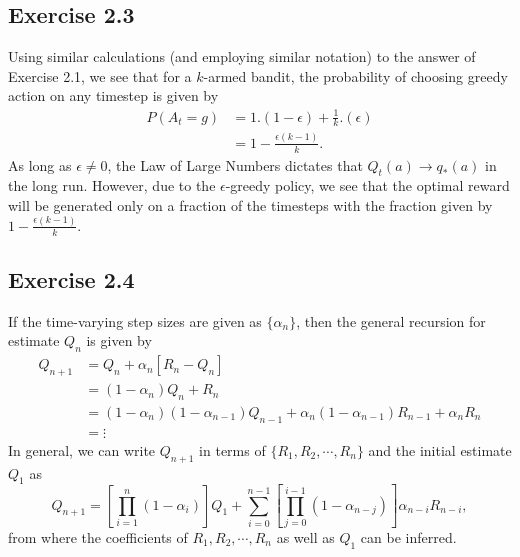 \documentclass[10pt]{article}
\begin{document}
	\subsection*{Exercise 2.3}
	\label{ss:2.3}
	Using similar calculations (and employing similar notation) to the answer of Exercise 2.1, we see that for a $k$-armed bandit, the probability of choosing greedy action on any timestep is given by
	\begin{align*}
	P(A_t = g) &= 1.(1-\epsilon) + \frac{1}{k}.(\epsilon)\\ 
	&= 1- \frac{\epsilon(k-1)}{k}.
	\end{align*}
	As long as $\epsilon \neq 0$, the Law of Large Numbers dictates that $Q_t(a) \rightarrow q_{*}(a)$ in the long run. However, due to the $\epsilon$-greedy policy, we see that the optimal reward will be generated only on a fraction of the timesteps with the fraction given by $1-\frac{\epsilon(k-1)}{k}$.
	\subsection*{Exercise 2.4}
	\label{ss:2.4}
	If the time-varying step sizes are given as $\{ \alpha_n \}$, then the general recursion for estimate $Q_n$ is given by
	\begin{align*}
	Q_{n+1} &= Q_n + \alpha_n \left[ R_n - Q_n \right]\\
	 &= (1-\alpha_n)Q_n + R_n\\
	 &= (1-\alpha_n)(1-\alpha_{n-1}) Q_{n-1} + \alpha_n(1-\alpha_{n-1})R_{n-1} + \alpha_n R_n\\
	 &= \vdots
	\end{align*}
	In general, we can write $Q_{n+1}$ in terms of $\{ R_1,R_2,\cdots,R_n \}$ and the initial estimate $Q_1$ as
	\begin{equation*}
	Q_{n+1} = \left[\prod_{i=1}^{n}(1-\alpha_{i})\right]Q_1 + \sum_{i=0}^{n-1} \left[ \prod_{j=0}^{i-1}(1-\alpha_{n-j}) \right]\alpha_{n-i}R_{n-i},
	\end{equation*}
	from where the coefficients of $R_1,R_2,\cdots,R_n$ as well as $Q_1$ can be inferred.
\end{document}
